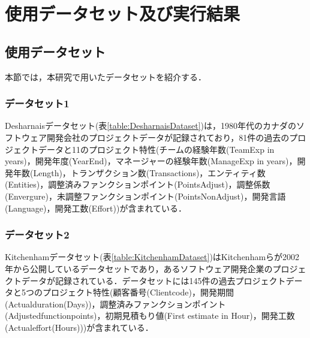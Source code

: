 \section{使用データセット及び実行結果}
\subsection{使用データセット}
本節では，本研究で用いたデータセットを紹介する．
\subsubsection{データセット1}
Desharnaisデータセット\cite{Desharnais89}(表\ref{table:DesharnaisDataset})は，1980年代のカナダのソフトウェア開発会社のプロジェクトデータが記録されており，81件の過去のプロジェクトデータと11のプロジェクト特性(チームの経験年数(TeamExp in years)，開発年度(YearEnd)，マネージャーの経験年数(ManageExp in years)，開発年数(Length)，トランザクション数(Transactions)，エンティティ数(Entities)，調整済みファンクションポイント(PointsAdjust)，調整係数(Envergure)，未調整ファンクションポイント(PointsNonAdjust)，開発言語(Language)，開発工数(Effort))が含まれている．

\subsubsection{データセット2}
Kitchenhamデータセット\cite{Kitchenham2002}(表\ref{table:KitchenhamDataset})はKitchenhamらが2002年から公開しているデータセットであり，あるソフトウェア開発企業のプロジェクトデータが記録されている．データセットには145件の過去プロジェクトデータと5つのプロジェクト特性(顧客番号(Clientcode)，開発期間(Actualduration(Days))，調整済みファンクションポイント(Adjustedfunctionpoints)，初期見積もり値(First estimate in Hour)，開発工数(Actualeffort(Hours)))が含まれている．

\begin{table*}[ht]
  \centering
  \captionsetup{labelformat=empty} %
  \caption{}
  \label{table:KitchenhamDataset}
  \begin{center}
  \end{center}
\end{table*}


